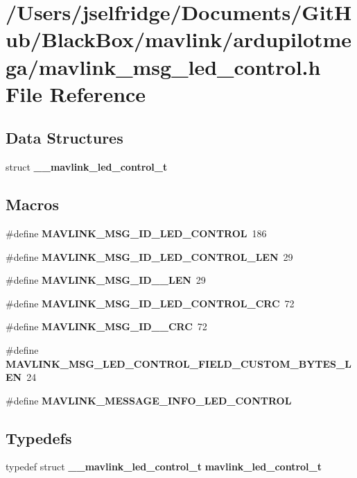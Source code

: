 \section{/\+Users/jselfridge/\+Documents/\+Git\+Hub/\+Black\+Box/mavlink/ardupilotmega/mavlink\+\_\+msg\+\_\+led\+\_\+control.h File Reference}
\label{mavlink__msg__led__control_8h}
\subsection*{Data Structures}
\begin{DoxyCompactItemize}
\item 
struct \textbf{ \+\_\+\+\_\+mavlink\+\_\+led\+\_\+control\+\_\+t}
\end{DoxyCompactItemize}
\subsection*{Macros}
\begin{DoxyCompactItemize}
\item 
\#define \textbf{ M\+A\+V\+L\+I\+N\+K\+\_\+\+M\+S\+G\+\_\+\+I\+D\+\_\+\+L\+E\+D\+\_\+\+C\+O\+N\+T\+R\+OL}~186
\item 
\#define \textbf{ M\+A\+V\+L\+I\+N\+K\+\_\+\+M\+S\+G\+\_\+\+I\+D\+\_\+\+L\+E\+D\+\_\+\+C\+O\+N\+T\+R\+O\+L\+\_\+\+L\+EN}~29
\item 
\#define \textbf{ M\+A\+V\+L\+I\+N\+K\+\_\+\+M\+S\+G\+\_\+\+I\+D\+\_\+\_\+\+L\+EN}~29
\item 
\#define \textbf{ M\+A\+V\+L\+I\+N\+K\+\_\+\+M\+S\+G\+\_\+\+I\+D\+\_\+\+L\+E\+D\+\_\+\+C\+O\+N\+T\+R\+O\+L\+\_\+\+C\+RC}~72
\item 
\#define \textbf{ M\+A\+V\+L\+I\+N\+K\+\_\+\+M\+S\+G\+\_\+\+I\+D\+\_\+\_\+\+C\+RC}~72
\item 
\#define \textbf{ M\+A\+V\+L\+I\+N\+K\+\_\+\+M\+S\+G\+\_\+\+L\+E\+D\+\_\+\+C\+O\+N\+T\+R\+O\+L\+\_\+\+F\+I\+E\+L\+D\+\_\+\+C\+U\+S\+T\+O\+M\+\_\+\+B\+Y\+T\+E\+S\+\_\+\+L\+EN}~24
\item 
\#define \textbf{ M\+A\+V\+L\+I\+N\+K\+\_\+\+M\+E\+S\+S\+A\+G\+E\+\_\+\+I\+N\+F\+O\+\_\+\+L\+E\+D\+\_\+\+C\+O\+N\+T\+R\+OL}
\end{DoxyCompactItemize}
\subsection*{Typedefs}
\begin{DoxyCompactItemize}
\item 
typedef struct \textbf{ \+\_\+\+\_\+mavlink\+\_\+led\+\_\+control\+\_\+t} \textbf{ mavlink\+\_\+led\+\_\+control\+\_\+t}
\end{DoxyCompactItemize}


